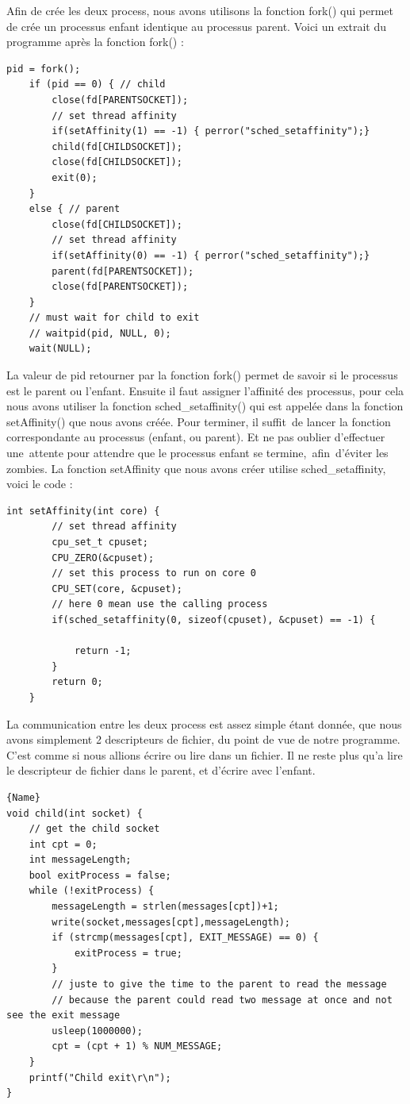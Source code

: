 \documentclass[
	a4paper, %
	10pt, %
]{CSUniSchoolLabReport}
\begin{document}
Afin de crée les deux process, nous avons utilisons la fonction fork() qui permet de crée un processus enfant identique au processus parent.
Voici un extrait du programme apr\`es la fonction fork() :
\begin{lstlisting}[style=CStyle, firstnumber=1]
	pid = fork();
    if (pid == 0) { // child 
        close(fd[PARENTSOCKET]); 
        // set thread affinity
        if(setAffinity(1) == -1) { perror("sched_setaffinity");}
        child(fd[CHILDSOCKET]);
        close(fd[CHILDSOCKET]);
        exit(0);
    }
    else { // parent 
        close(fd[CHILDSOCKET]);
        // set thread affinity
        if(setAffinity(0) == -1) { perror("sched_setaffinity");}
        parent(fd[PARENTSOCKET]);
        close(fd[PARENTSOCKET]);
    }
    // must wait for child to exit
    // waitpid(pid, NULL, 0);
    wait(NULL);
\end{lstlisting}
La valeur de pid retourner par la fonction fork() permet de savoir si le processus est le parent ou l'enfant.
Ensuite il faut assigner l'affinité des processus, pour cela nous avons utiliser la fonction sched\_setaffinity() qui est appelée dans la fonction setAffinity() que nous avons cré\'ee.
Pour terminer, il suffit\ de lancer la fonction correspondante au processus (enfant, ou parent).
Et ne pas oublier d'effectuer une\ attente pour attendre que le processus enfant se termine,\ afin\ d'\'eviter les zombies.
La fonction setAffinity que nous avons créer utilise sched\_setaffinity, voici le code : \\
\begin{lstlisting}[style=CStyle, firstnumber=1]
	int setAffinity(int core) {
		// set thread affinity
		cpu_set_t cpuset;
		CPU_ZERO(&cpuset);
		// set this process to run on core 0
		CPU_SET(core, &cpuset);
		// here 0 mean use the calling process
		if(sched_setaffinity(0, sizeof(cpuset), &cpuset) == -1) {
	
			return -1;
		}
		return 0;
	}
\end{lstlisting}
La communication entre les deux process est assez simple \'etant donnée, que nous avons simplement 2 descripteurs de fichier, du point de vue de notre programme. C'est comme si nous allions écrire ou lire dans un fichier.
Il ne reste plus qu'a lire le descripteur de fichier dans le parent, et d'écrire avec l'enfant.\\
\noindent\begin{minipage}{.50\textwidth}
\begin{lstlisting}[style=CStyle, caption=Processus Enfant, firstnumber=1]{Name}
void child(int socket) {
	// get the child socket
	int cpt = 0;
	int messageLength;
	bool exitProcess = false;
	while (!exitProcess) {
		messageLength = strlen(messages[cpt])+1;
		write(socket,messages[cpt],messageLength);
		if (strcmp(messages[cpt], EXIT_MESSAGE) == 0) {
			exitProcess = true;
		}
		// juste to give the time to the parent to read the message
		// because the parent could read two message at once and not see the exit message
		usleep(1000000); 
		cpt = (cpt + 1) % NUM_MESSAGE;
	}
	printf("Child exit\r\n");
}
\end{lstlisting}
\end{minipage}\hfill
\end{document}
